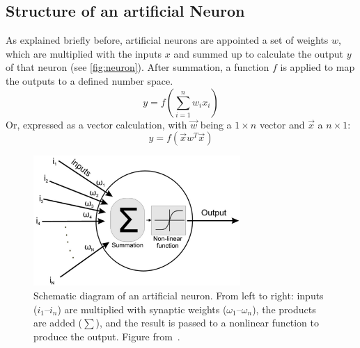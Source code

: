 \subsection{Structure of an artificial Neuron}\label{subsec:structure-neuron}
As explained briefly before, artificial neurons are appointed a set of weights $w$, which are multiplied with the inputs $x$ and summed up to calculate the output $y$ of that neuron (see \autoref{fig:neuron}).
After summation, a function $f$ is applied to map the outputs to a defined number space.
\begin{equation}
    y = f(\sum^n_{i=1}w_ix_i)
    \label{eq:single-neuron}
\end{equation}
Or, expressed as a vector calculation, with $\vec{w}$ being a $1 \times n$ vector and $\vec{x}$ a $n \times 1$:
\begin{equation}
    y = f(\vec{x}w^T \vec{x})
    \label{eq:single-neuron-vector}
\end{equation}

\begin{figure}[!htb]
    \centering
    \includegraphics[width=0.7\textwidth]{pictures/neuron}
    \caption[Schema of an artificial neuron]{Schematic diagram of an artificial neuron. From left to right: inputs ($i_1$–$i_n$) are multiplied with synaptic weights ($\omega_1$–$\omega_n$), the products are added ($\sum$), and the result is passed to a nonlinear function to produce the output. Figure from~\autocite{Pouliakis2016}.}
    \label{fig:neuron}
\end{figure}

